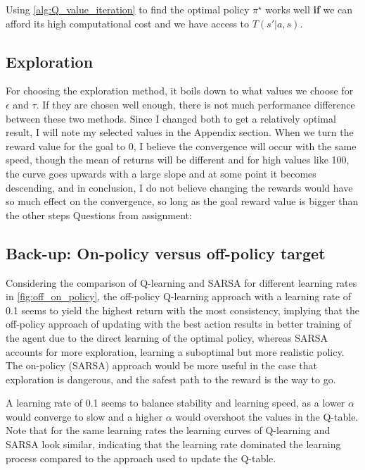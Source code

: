 \documentclass{article}
\theoremstyle{plain}
\theoremstyle{definition}
\theoremstyle{remark}
\begin{document}
Using \autoref{alg:Q_value_iteration} to find the optimal policy $\pi^\star$ works well \textbf{if} we can afford its high computational cost and we have access to $T(s'|a,s)$.


\subsection{Exploration}\label{subsec:discussion_exploration}
 For choosing the exploration method, it boils down to what values we choose for $\epsilon$ and $\tau$. If they are chosen well enough, there is not much performance difference between these two methods. Since I changed both to get a relatively optimal result, I will note my selected values in the Appendix section.
When we turn the reward value for the goal to 0, I believe the convergence will occur with the same speed, though the mean of returns will be different and for high values like 100, the curve goes upwards with a large slope and at some point it becomes descending, and in conclusion, I do not believe changing the rewards would have so much effect on the convergence, so long as the goal reward value is bigger than the other steps 
Questions from assignment: \\

\subsection{ Back-up: On-policy versus off-policy target}\label{subsec:discussion_backup_on_off}

Considering the comparison of Q-learning and SARSA for different learning rates in \autoref{fig:off_on_policy}, the off-policy Q-learning approach with a learning rate of 0.1 seems to yield the highest return with the most consistency, implying that the off-policy approach of updating with the best action results in better training of the agent due to the direct learning of the optimal policy, whereas SARSA accounts for more exploration, learning a suboptimal but more realistic policy.
The on-policy (SARSA) approach would be more useful in the case that exploration is dangerous, and the safest path to the reward is the way to go.

A learning rate of 0.1 seems to balance stability and learning speed, as a lower $\alpha$ would converge to slow and a higher $\alpha$ would overshoot the values in the Q-table. Note that for the same learning rates the learning curves of Q-learning and SARSA look similar, indicating that the learning rate dominated the learning process compared to the approach used to update the Q-table.
\end{document}
